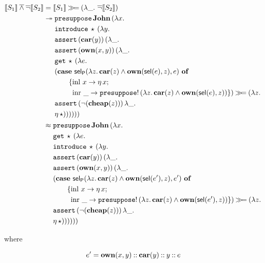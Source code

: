\begin{align*}
  \llbracket S_1 \rrbracket \mathbin{\overline{\land}} \mathop{\overline{\lnot}} \llbracket S_2 \rrbracket
  &= \llbracket S_1 \rrbracket \mathbin{\gg\!=} (\lambda \_.\, \mathop{\overline{\lnot}} \llbracket S_2 \rrbracket) \\
  &\twoheadrightarrow \begin{aligned}[t]
      &\mathtt{presuppose}\,\textbf{John}\,(\lambda x.\,  \\
      &\mathtt{introduce}\,\star\,(\lambda y.\,  \\
      &\mathtt{assert}\,(\textbf{car}(y))\,(\lambda \_.\,  \\
      &\mathtt{assert}\,(\textbf{own}(x, y))\,(\lambda \_.\,  \\
      &\mathtt{get}\,\star\,(\lambda e.\,  \\
      &(\text{\textbf{case} $\textsf{sel}_{\textsf{P}}(\lambda z.\, \textbf{car}(z) \land \textbf{own}(\textsf{sel}(e), z), e)$ \textbf{of}} \\ &\qquad \{\operatorname{inl}\,x \to \eta\,x; \\ &\qquad \ \operatorname{inr}\,\_ \to \mathtt{presuppose}!\,(\lambda z.\, \textbf{car}(z) \land \textbf{own}(\textsf{sel}(e), z)) \}) \mathbin{\gg\!=} (\lambda z.\,  \\
      &\mathtt{assert}\,(\lnot (\textbf{cheap}(z)))\,\lambda \_.\,  \\
      &\eta\,\star))))))
    \end{aligned} \\
  &\approx \begin{aligned}[t]
      &\mathtt{presuppose}\,\textbf{John}\,(\lambda x.\,  \\
      &\mathtt{get}\,\star\,(\lambda e.\,  \\
      &\mathtt{introduce}\,\star\,(\lambda y.\,  \\
      &\mathtt{assert}\,(\textbf{car}(y))\,(\lambda \_.\,  \\
      &\mathtt{assert}\,(\textbf{own}(x, y))\,(\lambda \_.\,  \\
      &(\text{\textbf{case} $\textsf{sel}_{\textsf{P}}(\lambda z.\, \textbf{car}(z) \land \textbf{own}(\textsf{sel}(e'), z), e')$ \textbf{of}} \\ &\qquad \{\operatorname{inl}\,x \to \eta\,x; \\ &\qquad \ \operatorname{inr}\,\_ \to \mathtt{presuppose}!\,(\lambda z.\, \textbf{car}(z) \land \textbf{own}(\textsf{sel}(e'), z)) \}) \mathbin{\gg\!=} (\lambda z.\,  \\
      &\mathtt{assert}\,(\lnot (\textbf{cheap}(z)))\,\lambda \_.\,  \\
      &\eta\,\star))))))
    \end{aligned}
\end{align*}

where

$$
e' = \textbf{own}(x, y) \mathbin{::} \textbf{car}(y) \mathbin{::} y \mathbin{::} e
$$

